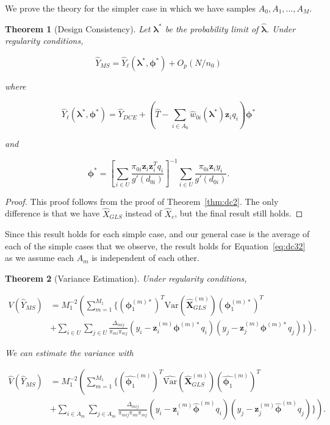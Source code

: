 \documentclass[12pt]{article}
\newtheorem{theorem}{Theorem}
\newcommand{\Var}{{\text{Var}}}
\renewcommand{\bf}[1]{\mathbf{#1}}
\begin{document}
We prove the theory for the simpler case in which we have samples $A_0, A_1,
\dots, A_{M}$. 

\begin{theorem}[Design Consistency]
  Let $\bm \lambda^*$ be the probability limit of $\hat{\bm \lambda}$.
  Under regularity conditions,

  $$\hat Y_{MS} = \hat Y_{\ell}(\bm \lambda^*, \bm \phi^*) + O_p(N / n_0)$$

  where

  $$\hat Y_\ell(\bm \lambda^*, \bm \phi^*) = \hat Y_{DCE} + \left(
    \hat T - \sum_{i \in A_0} \hat w_{0i}(\bm \lambda^*) \bf z_i q_i
  \right)\bm \phi^*$$

  and 

  $$\bm \phi^* = \left[\sum_{i \in U} \frac{\pi_{0i} \bf z_i \bf z_i^T
  q_i}{g'(d_{0i})}\right]^{-1} \sum_{i \in U} \frac{\pi_{0i} \bf z_i
  y_i}{g'(d_{0i})}.$$
\end{theorem}

\begin{proof}
  This proof follows from the proof of Theorem~\ref{thm:dc2}. The only
  difference is that we have $\hat X_{GLS}$ instead of $\hat X_c$, but the final
  result still holds.
\end{proof}

Since this result holds for each simple case, and our general case is the
average of each of the simple cases that we observe, the result holds for
Equation~\eqref{eq:dc32} as we assume each $A_m$ is independent of each other.

\begin{theorem}[Variance Estimation]
  Under regularity conditions,

  $$
  \begin{aligned}
    V(\hat Y_{MS}) 
    &= M_1^{-2} \left(\sum_{m = 1}^{M_1} 
    \Big\{(\bm \phi_1^{(m)*})^T\Var(\hat{\bf X}_{GLS}^{(m)})
      (\bm \phi_1^{(m)*})^T \right.\\
    &+ \left.
      \sum_{i \in U} \sum_{j \in U} \frac{\Delta_{mij}}{\pi_{mi}\pi_{mj}}
      (y_i - \bf z_i^{(m)}\bm \phi^{(m)*}q_i)
      (y_j - \bf z_j^{(m)}\bm \phi^{(m)*}q_j) \Big\} \right).
  \end{aligned}
  $$

  We can estimate the variance with

  $$
  \begin{aligned}
    \hat V(\hat Y_{MS}) 
    &= M_1^{-2} \left(\sum_{m = 1}^{M_1} 
      \Big\{(\hat{\bm \phi_1}^{(m)})^T\hat \Var(\hat{\bf X}_{GLS}^{(m)})
        (\hat{\bm \phi_1}^{(m)})^T \right.\\
    &+ \left.
      \sum_{i \in A_m} \sum_{j \in A_m} \frac{\Delta_{mij}}{\pi_{mij}\pi_{mi}\pi_{mj}}
      (y_i - \bf z_i^{(m)}\hat{\bm \phi}^{(m)}q_i)
      (y_j - \bf z_j^{(m)}\hat{\bm \phi}^{(m)}q_j) \Big\} \right).
  \end{aligned}
  $$

\end{theorem}
\end{document}
